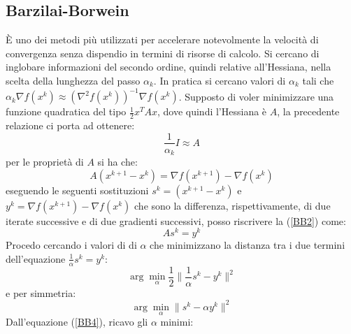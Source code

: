 \documentclass{report}
\begin{document}
\subsection{Barzilai-Borwein}
\`E uno dei metodi più utilizzati per accelerare notevolmente la velocità di convergenza senza dispendio in termini di risorse di calcolo. Si cercano di inglobare informazioni del secondo ordine, quindi relative all'Hessiana, nella scelta della lunghezza del passo $\alpha_k$. In pratica si cercano valori di $\alpha_k$ tali che $\alpha_k \nabla f(x^k) \approx (\nabla^2 f(x^k))^{-1}  \nabla f(x^k)$. Supposto di voler minimizzare una funzione quadratica del tipo $\frac{1}{2} x^T A x$, dove quindi l'Hessiana è $A$, la precedente relazione ci porta ad ottenere:
\begin{equation}
    \label{BB1}
        \frac{1}{\alpha_k} I \approx A	
\end{equation}
per le proprietà di $A$ si ha che:
\begin{equation}
    \label{BB2}
        A (x^{k+1} - x^{k}) = \nabla f(x^{k+1}) -\nabla f( x^{k} )
\end{equation}
eseguendo le seguenti sostituzioni $s^k =(x^{k+1} - x^{k})$ e $y^k=\nabla f(x^{k+1}) -\nabla f( x^{k} )$ che sono la differenza, rispettivamente, di due iterate successive e di due gradienti successivi, posso riscrivere la (\ref{BB2}) come:
\begin{equation}
    \label{BB3}
        A s^k = y^k
\end{equation}
Procedo cercando i valori di di $\alpha$ che minimizzano la distanza tra i due termini dell'equazione $\frac{1}{\alpha}  s^k = y^k$:
\begin{equation} 
\label{BB4}
\arg\min_{\alpha} \frac{1}{2} \|\frac{1}{\alpha} s^k - y^k\|^2 
\end{equation}
e per simmetria:
\begin{equation} 
\label{BB5}
\arg\min_{\alpha} \| s^k -\alpha y^k\|^2 
\end{equation}
Dall'equazione (\ref{BB4}), ricavo gli $\alpha$ minimi:
\end{document}
